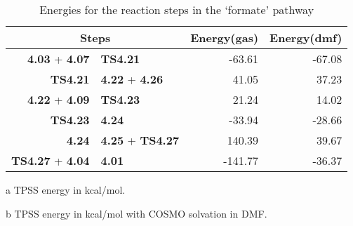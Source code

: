 \begin{table}[!htb]
\centering
 \begin{threeparttable}
  \caption{Energies for the reaction steps in the `formate' pathway}
    \begin{tabular}{r@{ $\rightarrow$ }lrr}
    \toprule
    \multicolumn{2}{c}{Steps} & Energy(gas)\tnote{a} & Energy(dmf)\tnote{b} \\
    \midrule
    \textbf{4.03} + \textbf{4.07} & \textbf{TS4.21} & -63.61 & -67.08 \\
    \textbf{TS4.21} & \textbf{4.22} + \textbf{4.26} & 41.05 & 37.23 \\
    \textbf{4.22} + \textbf{4.09} & \textbf{TS4.23} & 21.24 & 14.02 \\
    \textbf{TS4.23} & \textbf{4.24} & -33.94 & -28.66 \\
    \textbf{4.24} & \textbf{4.25} + \textbf{TS4.27} & 140.39 & 39.67 \\
    \textbf{TS4.27} + \textbf{4.04} & \textbf{4.01} & -141.77 & -36.37 \\
    \bottomrule
    \end{tabular}%
    \begin{tablenotes}
    \item [a] TPSS energy in kcal/mol.
    \item [b] TPSS energy in kcal/mol with COSMO solvation in DMF.
    \end{tablenotes}
  \label{tab.formrxn}%
 \end{threeparttable}
\end{table}%

